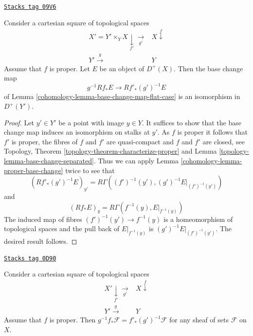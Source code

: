 \begin{theorem}

\label{cohomology-theorem-proper-base-change}
\href{https://stacks.math.columbia.edu/tag/09V6}{\texttt{Stacks tag 09V6}}

\begin{reference}
\cite[Expose V bis, 4.1.1]{SGA4}
\end{reference}
Consider a cartesian square of topological spaces
$$
\begin{array}{cc}X' = Y' \times_Y X \underset{f'}{\downarrow}\underset{g'}{\longrightarrow} & X \overset{f}{\downarrow} \\ Y' \overset{g}{\longrightarrow} & Y\end{array}
$$
Assume that $f$ is proper.
Let $E$ be an object of $D^+(X)$. Then the base change map
$$
g^{-1}Rf_*E \longrightarrow Rf'_*(g')^{-1}E
$$
of Lemma \ref{cohomology-lemma-base-change-map-flat-case} is an isomorphism
in $D^+(Y')$.
\end{theorem}

\begin{proof}

Let $y' \in Y'$ be a point with image $y \in Y$. It suffices to show that
the base change map induces an isomorphism on stalks at $y'$.
As $f$ is proper it follows that $f'$ is proper, the
fibres of $f$ and $f'$ are quasi-compact and $f$ and $f'$ are closed, see
Topology, Theorem \ref{topology-theorem-characterize-proper} and
Lemma \ref{topology-lemma-base-change-separated}.
Thus we can apply Lemma \ref{cohomology-lemma-proper-base-change} twice to see that
$$
(Rf'_*(g')^{-1}E)_{y'} = R\Gamma((f')^{-1}(y'), (g')^{-1}E|_{(f')^{-1}(y')})
$$
and
$$
(Rf_*E)_y = R\Gamma(f^{-1}(y), E|_{f^{-1}(y)})
$$
The induced map of fibres $(f')^{-1}(y') \to f^{-1}(y)$ is
a homeomorphism of topological spaces and the pull back of
$E|_{f^{-1}(y)}$ is $(g')^{-1}E|_{(f')^{-1}(y')}$. The
desired result follows.
\end{proof}

\begin{lemma}

\label{cohomology-lemma-proper-base-change-sheaves-of-sets}
\href{https://stacks.math.columbia.edu/tag/0D90}{\texttt{Stacks tag 0D90}}

Consider a cartesian square of topological spaces
$$
\begin{array}{cc}X' \underset{f'}{\downarrow}\underset{g'}{\longrightarrow} & X \overset{f}{\downarrow} \\ Y' \overset{g}{\longrightarrow} & Y\end{array}
$$
Assume that $f$ is proper. Then
$g^{-1}f_*\mathcal{F} = f'_*(g')^{-1}\mathcal{F}$
for any sheaf of sets $\mathcal{F}$ on $X$.
\end{lemma}

